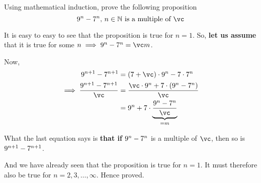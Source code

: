 

\SUBTRACT\va\vb\vc

\question[4] Using mathematical induction, prove the following proposition
\[ \va^n-\vb^n,\,n\in\mathbb{N} \text{ is a multiple of }\vc \]

\insertQR{}

\watchout

\begin{solution}[\halfpage]
  It is easy to easy to see that the proposition is true for $n=1$. 
  So, \textbf{let us assume} that it is true for some $n\implies\va^n-\vb^n=\vc m$.

  Now, 
  \begin{align}
    \va^{n+1} - \vb^{n+1} &= (\vb + \vc)\cdot\va^n - \vb\cdot\vb^n \\
    \implies\dfrac{\va^{n+1}-\vb^{n+1}}{\vc} &= \dfrac{\vc\cdot\va^n + \vb\cdot (\va^n - \vb^n)}{\vc} \\
    &= \va^n +\vb\cdot\underbrace{\dfrac{\va^n-\vb^n}{\vc}}_{= m}
  \end{align}

  What the last equation says is \textbf{ that if} $9^n-7^n$ is a multiple of $\vc$, then 
  so is $9^{n+1}-7^{n+1}$. 

  And we have already seen that the proposition is true for $n=1$. It must therefore also 
  be true for $n=2,3,\ldots,\infty$. Hence proved.
\end{solution}

